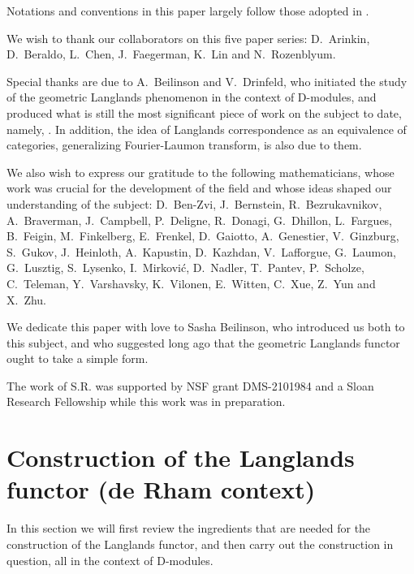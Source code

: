 \documentclass[9pt]{amsart}
\theoremstyle{remark}
\theoremstyle{definition}
\theoremstyle{remark}
\numberwithin{equation}{section}
\begin{document}
Notations and conventions in this paper largely follow those adopted in \cite{AGKRRV}. 


We wish to thank our collaborators on this five paper series: D.~Arinkin, D.~Beraldo, L.~Chen, J.~Faegerman, K.~Lin
and N.~Rozenblyum. 

\medskip

Special thanks are due to A.~Beilinson and V.~Drinfeld, who initiated the study of the geometric Langlands
phenomenon in the context of D-modules, and produced what is still the most significant piece of work on the
subject to date, namely, \cite{BD}. In addition, the idea of Langlands correspondence as an equivalence of
categories, generalizing Fourier-Laumon transform, is also due to them. 

\medskip

We also wish to express our gratitude to the following mathematicians, whose work was crucial for the development of 
the field and whose ideas shaped our understanding of the subject: 
D.~Ben-Zvi, J.~Bernstein, R.~Bezrukavnikov, A.~Braverman, J.~Campbell, P.~Deligne,
R.~Donagi, G.~Dhillon, L.~Fargues, B.~Feigin, M.~Finkelberg, E.~Frenkel, D.~Gaiotto, A.~Genestier, V.~Ginzburg,
S.~Gukov, J.~Heinloth, A.~Kapustin, D.~Kazhdan,
V.~Lafforgue, G.~Laumon, G.~Lusztig, S.~Lysenko, I.~Mirkovi\'c, D.~Nadler, T.~Pantev, P.~Scholze,
C.~Teleman, Y.~Varshavsky, K.~Vilonen, E.~Witten, C.~Xue, Z.~Yun and X.~Zhu.

\medskip

We dedicate this paper with love to Sasha Beilinson, who introduced us both
to this subject, and who suggested long ago that the 
geometric Langlands functor ought to take a simple form.

\medskip 

The work of S.R. was supported by NSF grant DMS-2101984 and a Sloan Research Fellowship 
while this work was in preparation.

\section{Construction of the Langlands functor (de Rham context)} \label{s:functor}

In this section we will first review the ingredients that are needed for the construction of the Langlands functor,
and then carry out the construction in question, all in the context of D-modules. 

\medskip
\end{document}
